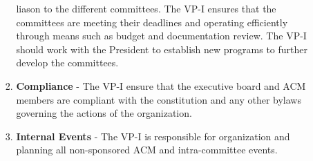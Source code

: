 \documentclass[11pt,a4paper,notitlepage]{article}
\begin{document}
\begin{enumerate}[label=\Alph*.]
\begin{enumerate}[label=\arabic*.]
\begin{enumerate}[label=\alph*.]
            liason to the different committees. The VP-I ensures that the
            committees are meeting their deadlines and operating efficiently
            through means such as budget and documentation review. The VP-I
            should work with the President to establish new programs to further
            develop the committees.
          \item \textbf{Compliance} - The VP-I ensure that the executive board
            and ACM members are compliant with the constitution and any other
            bylaws governing the actions of the organization.
          \item \textbf{Internal Events} - The VP-I is responsible for
            organization and planning all non-sponsored ACM and intra-committee
            events.
        \end{enumerate}


\end{enumerate}
\end{enumerate}
\end{document}
